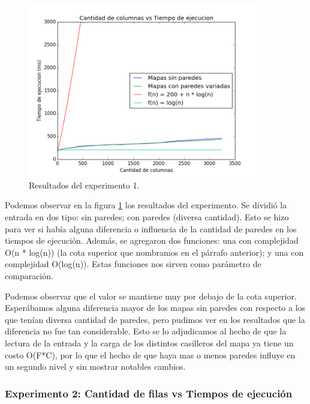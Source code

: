 \begin{figure}[H]
  \centering
  \includegraphics[width=0.9\textwidth]{Problema2/img/exp1_columnas.png}
  \caption{Resultados del experimento 1.}
  \label{fig: ej1_exp1_columnas}
\end{figure}

\par Podemos observar en la figura \ref{fig: ej1_exp1_columnas} los resultados del experimento. Se dividió la entrada en dos tipo: sin paredes; con paredes (diversa cantidad). Esto se hizo para ver si había alguna diferencia o influencia de la cantidad de paredes en los tiempos de ejecución. Además, se agregaron dos funciones: una con complejidad O(n * log(n)) (la cota superior que nombramos en el párrafo anterior); y una con complejidad O(log(n)). Estas funciones nos sirven como parámetro de comparación.

\par Podemos observar que el valor se mantiene muy por debajo de la cota superior. Esperábamos alguna diferencia mayor de los mapas sin paredes con respecto a los que tenían diversa cantidad de paredes, pero pudimos ver en los resultados que la diferencia no fue tan considerable. Esto se lo adjudicamos al hecho de que la lectura de la entrada y la carga de los distintos casilleros del mapa ya tiene un costo O(F*C), por lo que el hecho de que haya mas o menos paredes influye en un segundo nivel y sin mostrar notables cambios.


\subsubsection{Experimento 2: Cantidad de filas vs Tiempos de ejecución}

